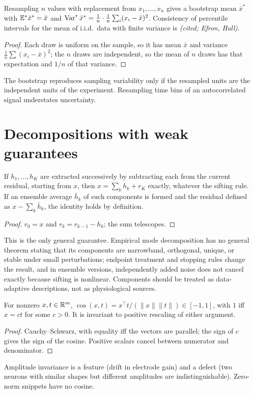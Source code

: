 \begin{proposition}\label{ars:boot-001}
Resampling $n$ values with replacement from $x_1,\dots,x_n$ gives a bootstrap mean $\bar x^*$ with $\mathbb E^*\bar x^*=\bar x$ and $\operatorname{Var}^*\bar x^*=\frac{1}{n}\cdot\frac1n\sum_i(x_i-\bar x)^2$. Consistency of percentile intervals for the mean of i.i.d.\ data with finite variance is \emph{(cited; Efron, Hall)}.
\end{proposition}
\begin{proof}
Each draw is uniform on the sample, so it has mean $\bar x$ and variance $\frac1n\sum(x_i-\bar x)^2$; the $n$ draws are independent, so the mean of $n$ draws has that expectation and $1/n$ of that variance.
\end{proof}
The bootstrap reproduces sampling variability only if the resampled units are the independent units of the experiment. Resampling time bins of an autocorrelated signal understates uncertainty.

\section{Decompositions with weak guarantees}
\begin{proposition}\label{ars:emd-001}
If $h_1,\dots,h_K$ are extracted successively by subtracting each from the current residual, starting from $x$, then $x=\sum_kh_k+r_K$ exactly, whatever the sifting rule. If an ensemble average $\bar h_k$ of such components is formed and the residual defined as $x-\sum_k\bar h_k$, the identity holds by definition.
\end{proposition}
\begin{proof}
$r_0=x$ and $r_k=r_{k-1}-h_k$; the sum telescopes.
\end{proof}
This is the only general guarantee. Empirical mode decomposition has no general theorem stating that its components are narrowband, orthogonal, unique, or stable under small perturbations; endpoint treatment and stopping rules change the result, and in ensemble versions, independently added noise does not cancel exactly because sifting is nonlinear. Components should be treated as data-adaptive descriptions, not as physiological sources.

\begin{proposition}\label{ars:wave-001}
For nonzero $x,t\in\mathbb R^m$, $\cos(x,t)=x^\top t/(\|x\|\|t\|)\in[-1,1]$, with $1$ iff $x=ct$ for some $c>0$. It is invariant to positive rescaling of either argument.
\end{proposition}
\begin{proof}
Cauchy--Schwarz, with equality iff the vectors are parallel; the sign of $c$ gives the sign of the cosine. Positive scalars cancel between numerator and denominator.
\end{proof}
Amplitude invariance is a feature (drift in electrode gain) and a defect (two neurons with similar shapes but different amplitudes are indistinguishable). Zero-norm snippets have no cosine.

